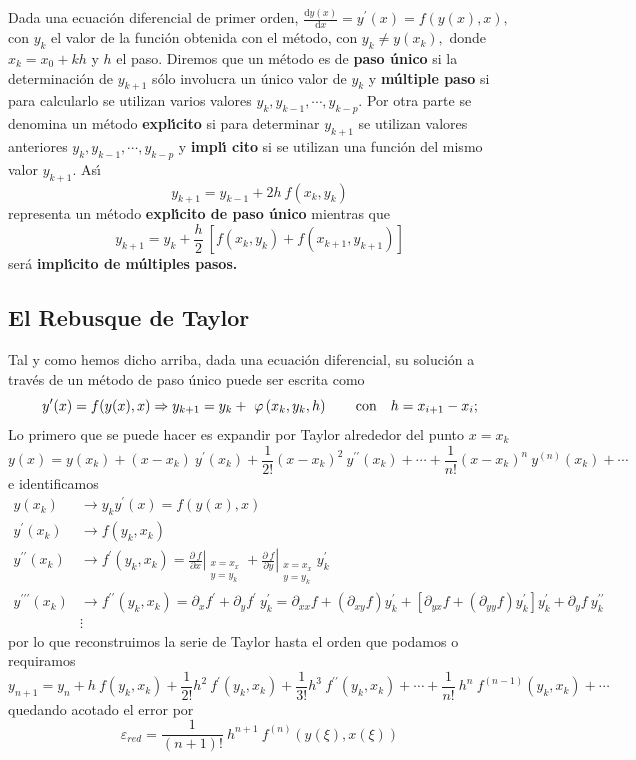 \documentclass[spanish,titlepage,11pt]{article}
\begin{document}
Dada una ecuaci\'{o}n diferencial de primer orden, $\frac{\mathrm{d}%
y(x)}{\mathrm{d}x}=y^{\prime}(x)=f(y(x),x),$ con $y_{k}$ el valor de la
funci\'{o}n obtenida con el m\'{e}todo, con $y_{k}\neq y(x_{k}),$ donde
$x_{k}=x_{0}+kh$ y $h$ el paso. Diremos que un m\'{e}todo es de \textbf{paso
\'{u}nico} si la determinaci\'{o}n de $y_{k+1}$ s\'{o}lo involucra un
\'{u}nico valor de $y_{k}$ y \textbf{m\'{u}ltiple paso} si para calcularlo se
utilizan varios valores $y_{k},y_{k-1},\cdots,y_{k-p}.$ Por otra parte se
denomina un m\'{e}todo \textbf{expl\'{\i}cito} si para determinar $y_{k+1}$ se
utilizan valores anteriores $y_{k},y_{k-1},\cdots,y_{k-p}$ y \textbf{impl\'{\i
}cito} si se utilizan una funci\'{o}n del mismo valor $y_{k+1}.$ As\'{\i}
\[
y_{k+1}=y_{k-1}+2h\ f\left(  x_{k},y_{k}\right)
\]
representa un m\'{e}todo \textbf{expl\'{\i}cito de paso \'{u}nico} mientras
que
\[
y_{k+1}=y_{k}+\frac{h}{2}\ \left[  f\left(  x_{k},y_{k}\right)  +f\left(
x_{k+1},y_{k+1}\right)  \right]
\]
ser\'{a} \textbf{impl\'{\i}cito de m\'{u}ltiples pasos.}

\subsection{El Rebusque de Taylor}

Tal y como hemos dicho arriba, dada una ecuaci\'{o}n diferencial, su
soluci\'{o}n a trav\'{e}s de un m\'{e}todo de paso \'{u}nico puede ser escrita
como
\[
y^{\prime}(x)=f(y(x),x)\Rightarrow y_{k+1}=y_{k}+\ \varphi\left(  x_{k}%
,y_{k},h\right)  \qquad\text{con\quad}h=x_{i+1}-x_{i};
\]
Lo primero que se puede hacer es expandir por Taylor alrededor del punto
$x=x_{k}$%
\[
y(x)=y(x_{k})+\left(  x-x_{k}\right)  \ y^{\prime}(x_{k})+\frac{1}{2!}\left(
x-x_{k}\right)  ^{2}\ y^{\prime\prime}(x_{k})+\cdots+\frac{1}{n!}\left(
x-x_{k}\right)  ^{n}\ y^{(n)}(x_{k})+\cdots
\]
e identificamos
\begin{align*}
y(x_{k})  &  \rightarrow y_{k}y^{\prime}(x)=f(y(x),x)\\
y^{\prime}(x_{k})  &  \rightarrow f(y_{k},x_{k})\\
y^{\prime\prime}(x_{k})  &  \rightarrow f^{\prime}(y_{k},x_{k})=\left.
\frac{\partial\ f}{\partial x}\right|  _{\substack{x=x_{x} \\y=y_{k}
}}+\left.  \frac{\partial\ f}{\partial y}\right|  _{\substack{x=x_{x}
\\y=y_{k} }}y_{k}^{\prime}\\
y^{\prime\prime\prime}(x_{k})  &  \rightarrow f^{\prime\prime}(y_{k}%
,x_{k})=\partial_{x}f^{\prime}+\partial_{y}f^{\prime}\ y_{k}^{\prime}%
=\partial_{xx}f+\left(  \partial_{xy}f\right)  y_{k}^{\prime}+\left[
\partial_{yx}f+\left(  \partial_{yy}f\right)  y_{k}^{\prime}\right]
y_{k}^{\prime}+\partial_{y}f\ y_{k}^{\prime\prime}\\
&  \vdots
\end{align*}
por lo que reconstruimos la serie de Taylor hasta el orden que podamos o
requiramos
\[
y_{n+1}=y_{n}+h\ f(y_{k},x_{k})+\frac{1}{2!}h^{2}\ f^{\prime}(y_{k}%
,x_{k})+\frac{1}{3!}h^{3}\ f^{\prime\prime}(y_{k},x_{k})+\cdots+\frac{1}%
{n!}\ h^{n}\ f^{(n-1)}(y_{k},x_{k})+\cdots
\]
quedando acotado el error por
\[
\varepsilon_{red}=\frac{1}{\left(  n+1\right)  !}\ h^{n+1}\ f^{(n)}%
(y(\xi),x(\xi))
\]
\end{document}
